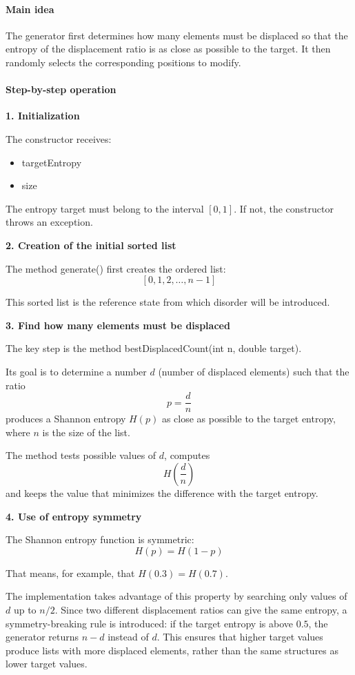 \documentclass{article}
\begin{document}
\paragraph{Main idea}

The generator first determines how many elements must be displaced so that the entropy of the displacement ratio is as close as possible to the target. It then randomly selects the corresponding positions to modify.

\paragraph{Step-by-step operation}

\textbf{1. Initialization}

The constructor receives:
\begin{itemize}
    \item targetEntropy
    \item size
\end{itemize}

The entropy target must belong to the interval $[0,1]$. If not, the constructor throws an exception.

\textbf{2. Creation of the initial sorted list}

The method generate() first creates the ordered list:
\[
[0,1,2,\dots,n-1]
\]

This sorted list is the reference state from which disorder will be introduced.

\textbf{3. Find how many elements must be displaced}

The key step is the method bestDisplacedCount(int n, double target).

Its goal is to determine a number $d$ (number of displaced elements) such that the ratio
\[
p = \frac{d}{n}
\]
produces a Shannon entropy $H(p)$ as close as possible to the target entropy, where $n$ is the size of the list.

The method tests possible values of $d$, computes
\[
H\left(\frac{d}{n}\right)
\]
and keeps the value that minimizes the difference with the target entropy.

\textbf{4. Use of entropy symmetry}

The Shannon entropy function is symmetric:
\[
H(p) = H(1-p)
\]

That means, for example, that $H(0.3) = H(0.7)$.

The implementation takes advantage of this property by searching only values of $d$ up to $n/2$. Since two different displacement ratios can give the same entropy, a symmetry-breaking rule is introduced: if the target entropy is above $0.5$, the generator returns $n - d$ instead of $d$. This ensures that higher target values produce lists with more displaced elements, rather than the same structures as lower target values.
\end{document}
